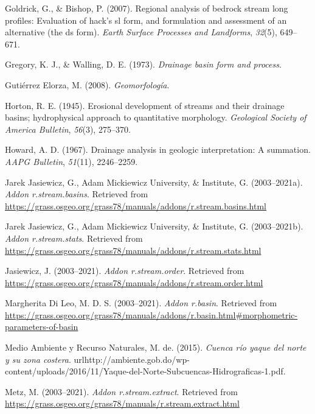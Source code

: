 \documentclass[11pt,]{article}
\begin{document}
\hypertarget{ref-goldrick2007regional}{}
Goldrick, G., \& Bishop, P. (2007). Regional analysis of bedrock stream
long profiles: Evaluation of hack's sl form, and formulation and
assessment of an alternative (the ds form). \emph{Earth Surface
Processes and Landforms}, \emph{32}(5), 649--671.

\hypertarget{ref-gregory1973drainage}{}
Gregory, K. J., \& Walling, D. E. (1973). \emph{Drainage basin form and
process}.

\hypertarget{ref-gutierrez2008geomorfologia}{}
Gutiérrez Elorza, M. (2008). \emph{Geomorfología}.

\hypertarget{ref-horton1945erosional}{}
Horton, R. E. (1945). Erosional development of streams and their
drainage basins; hydrophysical approach to quantitative morphology.
\emph{Geological Society of America Bulletin}, \emph{56}(3), 275--370.

\hypertarget{ref-howard1967drainage}{}
Howard, A. D. (1967). Drainage analysis in geologic interpretation: A
summation. \emph{AAPG Bulletin}, \emph{51}(11), 2246--2259.

\hypertarget{ref-streambasinsjareck}{}
Jarek Jasiewicz, G., Adam Mickiewicz University, \& Institute, G.
(2003--2021a). \emph{Addon r.stream.basins}. Retrieved from
\url{https://grass.osgeo.org/grass78/manuals/addons/r.stream.basins.html}

\hypertarget{ref-streamstats}{}
Jarek Jasiewicz, G., Adam Mickiewicz University, \& Institute, G.
(2003--2021b). \emph{Addon r.stream.stats}. Retrieved from
\url{https://grass.osgeo.org/grass78/manuals/addons/r.stream.stats.html}

\hypertarget{ref-streamorder}{}
Jasiewicz, J. (2003--2021). \emph{Addon r.stream.order}. Retrieved from
\url{https://grass.osgeo.org/grass78/manuals/addons/r.stream.order.html}

\hypertarget{ref-basinmargherita}{}
Margherita Di Leo, M. D. S. (2003--2021). \emph{Addon r.basin}.
Retrieved from
\url{https://grass.osgeo.org/grass78/manuals/addons/r.basin.html\#morphometric-parameters-of-basin}

\hypertarget{ref-Mmar2015cuenca}{}
Medio Ambiente y Recurso Naturales, M. de. (2015). \emph{Cuenca río
yaque del norte y su zona costera}.
urlhttp://ambiente.gob.do/wp-content/uploads/2016/11/Yaque-del-Norte-Subcuencas-Hidrograficas-1.pdf.

\hypertarget{ref-streamnextractmarkus}{}
Metz, M. (2003--2021). \emph{Addon r.stream.extract}. Retrieved from
\url{https://grass.osgeo.org/grass78/manuals/r.stream.extract.html}
\end{document}
